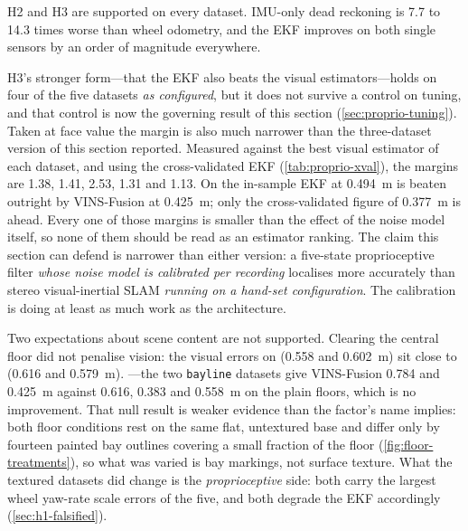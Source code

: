 H2 and H3 are supported on every dataset. IMU-only dead reckoning is 7.7 to 14.3
times worse than wheel odometry, and the EKF improves on both single sensors by an order
of magnitude everywhere.

H3's stronger form---that the EKF also beats the visual estimators---holds on four
of the five datasets \emph{as configured}, but it does not survive a control on
tuning, and that control is now the governing result of this section
(\cref{sec:proprio-tuning}). Taken at face value the margin is also much narrower
than the three-dataset version of this section reported.  Measured against the best
visual estimator of each dataset, and using the cross-validated EKF
(\cref{tab:proprio-xval}), the margins are 1.38, 1.41, 2.53, 1.31 and
\num{1.13}. On  the in-sample EKF at \SI{0.494}{\metre} is
beaten outright by VINS-Fusion at \SI{0.425}{\metre}; only the cross-validated
figure of \SI{0.377}{\metre} is ahead. Every one of those margins is smaller than
the effect of the noise model itself, so none of them should be read as an
estimator ranking. The claim this section can defend is narrower than either
version: a five-state proprioceptive filter \emph{whose noise model is calibrated
per recording} localises more accurately than stereo visual-inertial SLAM
\emph{running on a hand-set configuration}. The calibration is doing at least as
much work as the architecture.

Two expectations about scene content are not supported. Clearing the central floor
did not penalise vision: the visual errors on  (0.558 and
\SI{0.602}{\metre}) sit close to  (0.616 and
\SI{0.579}{\metre}). ---the two
\texttt{bayline} datasets give VINS-Fusion 0.784 and \SI{0.425}{\metre} against
0.616, 0.383 and \SI{0.558}{\metre} on the plain floors, which is no improvement.
That null result is weaker evidence than the factor's name implies: both floor
conditions rest on the same flat, untextured base and differ only by fourteen
painted bay outlines covering a small fraction of the floor
(\cref{fig:floor-treatments}), so what was varied is bay markings, not surface
texture.
What the textured datasets did change is the \emph{proprioceptive} side: both
carry the largest wheel yaw-rate scale errors of the five, and both degrade the
EKF accordingly (\cref{sec:h1-falsified}).

